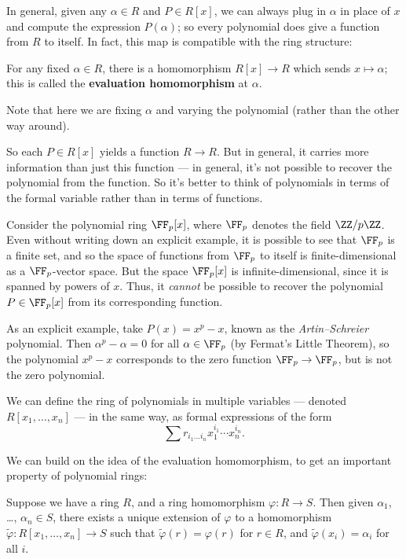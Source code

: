 In general, given any $\alpha \in R$ and $P \in R[x]$, we can always plug in $\alpha$ in place of $x$ and compute the expression $P(\alpha)$; so every polynomial does give a function from $R$ to itself. In fact, this map is compatible with the ring structure:

\begin{definition}
For any fixed $\alpha \in R$, there is a homomorphism $R[x] \to R$ which sends $x \mapsto \alpha$; this is called the \textbf{evaluation homomorphism} at $\alpha$. 
\end{definition}

Note that here we are fixing $\alpha$ and varying the polynomial (rather than the other way around). 

So each $P \in R[x]$ yields a function $R \to R$. But in general, it carries more information than just this function --- in general, it's not possible to recover the polynomial from the function. So it's better to think of polynomials in terms of the formal variable rather than in terms of functions.  

\begin{example}
Consider the polynomial ring $\FF_p[x]$, where $\FF_p$ denotes the field $\ZZ/p\ZZ$. Even without writing down an explicit example, it is possible to see that $\FF_p$ is a finite set, and so the space of functions from $\FF_p$ to itself is finite-dimensional as a $\FF_p$-vector space. But the space $\FF_p[x]$ is infinite-dimensional, since it is spanned by powers of $x$. Thus, it \emph{cannot} be possible to recover the polynomial $P \in \FF_p[x]$ from its corresponding function.

As an explicit example, take $P(x) = x^p - x$, known as the \emph{Artin--Schreier} polynomial. Then $\alpha^p - \alpha = 0$ for all $\alpha \in \FF_p$ (by Fermat's Little Theorem), so the polynomial $x^p - x$ corresponds to the zero function $\FF_p \to \FF_p$, but is not the zero polynomial.
\end{example}

We can define the ring of polynomials in multiple variables --- denoted $R[x_1, \ldots, x_n]$ --- in the same way, as formal expressions of the form \[\sum r_{i_1\ldots i_n}x_1^{i_1}\cdots x_n^{i_n}.\] 

We can build on the idea of the evaluation homomorphism, to get an important property of polynomial rings:

\begin{proposition}
    Suppose we have a ring $R$, and a ring homomorphism $\varphi : R \to S$. Then given $\alpha_1$, \ldots, $\alpha_n \in S$, there exists a unique extension of $\varphi$ to a homomorphism $\widetilde{\varphi} : R[x_1, \ldots, x_n] \to S$ such that $\widetilde{\varphi}(r) = \varphi(r)$ for $r \in R$, and $\widetilde{\varphi}(x_i) = \alpha_i$ for all $i$. 
\end{proposition}

